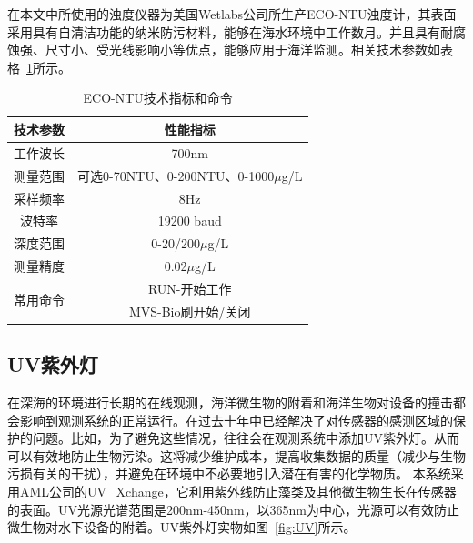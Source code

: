 在本文中所使用的浊度仪器为美国Wetlabs公司所生产ECO-NTU浊度计，其表面采用具有自清洁功能的纳米防污材料，能够在海水环境中工作数月。并且具有耐腐蚀强、尺寸小、受光线影响小等优点，能够应用于海洋监测。相关技术参数如表格~\ref{tab:ECO-NTU}所示。

\begin{table}[htb]
  \centering\small
  \caption{ECO-NTU技术指标和命令}
  \label{tab:ECO-NTU}
\begin{tabular}{|c|c|c|}
\hline
\multicolumn{2}{|c|}{\bf 技术参数}                  & {\bf 性能指标}                         \\ \hline
\multicolumn{2}{|l|}{工作波长}                  & \multicolumn{1}{|c|}{700nm}                \\ \hline
\multicolumn{2}{|l|}{测量范围}                  & \multicolumn{1}{c|}{可选0-70NTU、0-200NTU、0-1000$\mu$g/L}                \\ \hline
\multicolumn{2}{|l|}{采样频率}                  & \multicolumn{1}{c|}{8Hz}                         \\ \hline
\multicolumn{2}{|c|}{波特率}                  & \multicolumn{1}{c|}{19200 baud}                     \\ \hline
\multicolumn{2}{|l|}{深度范围}                  & \multicolumn{1}{c|}{0-20/200$\mu$g/L}                       \\ \hline
\multicolumn{2}{|l|}{测量精度}                  & \multicolumn{1}{c|}{0.02$\mu$g/L}                        \\ \hline
\multicolumn{2}{|c|}{\multirow{2}{*}{常用命令}} & \multicolumn{1}{c|}{RUN-开始工作}     \\ \cline{3-3} 
\multicolumn{2}{|l|}{}                          & \multicolumn{1}{c|}{MVS-Bio刷开始/关闭} \\ \hline
\end{tabular}
\end{table}


\subsection{UV紫外灯}

在深海的环境进行长期的在线观测，海洋微生物的附着和海洋生物对设备的撞击都会影响到观测系统的正常运行。在过去十年中已经解决了对传感器的感测区域的保护的问题。比如，为了避免这些情况，往往会在观测系统中添加UV紫外灯。从而可以有效地防止生物污染。这将减少维护成本，提高收集数据的质量（减少与生物污损有关的干扰），并避免在环境中不必要地引入潜在有害的化学物质。
本系统采用AML公司的UV\_Xchange，它利用紫外线防止藻类及其他微生物生长在传感器的表面。UV光源光谱范围是200nm-450nm，以365nm为中心，光源可以有效防止微生物对水下设备的附着。UV紫外灯实物如图~\ref{fig:UV}所示。

